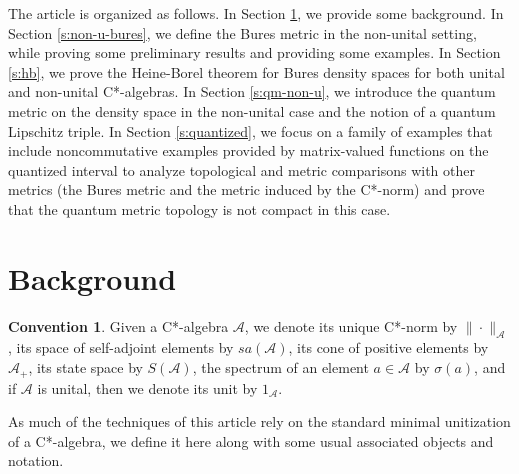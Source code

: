 \documentclass{amsart}
\theoremstyle{plain}
\theoremstyle{definition}
\newtheorem{convention}[theorem]{Convention}
\theoremstyle{remark}
\numberwithin{equation}{section}
\newcommand{\A}{{\mathcal{A}}}
\begin{document}
The article is organized as follows. In Section \ref{s:background}, we provide some background. In Section \ref{s:non-u-bures}, we define the Bures metric in the non-unital setting, while proving some preliminary results and providing some examples. In Section \ref{s:hb}, we prove the Heine-Borel theorem for Bures density spaces for both unital and non-unital C*-algebras. In Section \ref{s:qm-non-u}, we introduce the quantum metric on the density space in the non-unital case and the notion of a quantum Lipschitz triple. In Section \ref{s:quantized}, we focus on a family of examples that include noncommutative examples provided by matrix-valued functions on the quantized interval to analyze topological and metric comparisons with other metrics (the Bures metric and the metric induced by the C*-norm) and prove that the quantum metric topology is not compact in this case.

 


\section{Background}\label{s:background}

\begin{convention}
    Given a C*-algebra $\A$, we denote its unique C*-norm by $\|\cdot\|_\A$, its space of self-adjoint elements by $sa(\A)$, its cone of positive elements by $\A_+ $, its state space by $S(\A)$,   the spectrum of an element $a\in \A$ by $\sigma(a)$, and if $\A$ is unital, then we denote its unit by $1_\A$.
\end{convention}

As much of the techniques of this article rely on the standard minimal unitization of a C*-algebra, we define it here along with some usual associated objects and notation.
\end{document}

